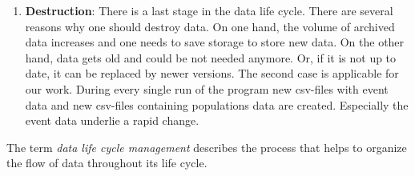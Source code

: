 \begin{enumerate}
	\item \textbf{Destruction}: There is a last stage in the data life cycle. There are several reasons why one should destroy data. On one hand, the volume of archived data increases and one needs to save storage to store new data. On the other hand, data gets old and could be not needed anymore. Or, if it is not up to date, it can be replaced by newer versions. The second case is applicable for our work. During every single run of the program new csv-files with event data and new csv-files containing populations data are created. Especially the event data underlie a rapid change.
\end{enumerate}

The term \emph{data life cycle management} describes the process that helps to organize the flow of data throughout its life cycle.